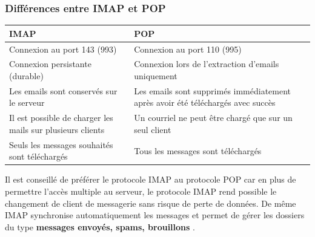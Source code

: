 \documentclass[a4paper,12pt,french]{report} %
\begin{document}
\subsubsection{Différences entre IMAP et POP}
\cesure
\begin{table}[H]
	\centering
\begin{tabu}{|X[l]|X[l]|}
	\hline
	\centering \textbf{IMAP} & \centering \textbf{POP}  \\
	\hline
	Connexion au port 143 (993) & Connexion au port 110 (995) \\
	\hline	
	Connexion persistante (durable) & Connexion lors de l'extraction d'emails uniquement \\
	\hline
	Les emails sont conservés sur le serveur & Les emails sont supprimés immédiatement après avoir été téléchargés avec succès \\
	\hline
	Il est possible de charger les mails sur plusieurs clients & Un courriel ne peut être chargé que sur un seul client \\
	\hline
	Seuls les messages souhaités sont téléchargés & Tous les messages sont téléchargés \\
	\hline	
\end{tabu}
\end{table}
\nocesure

Il est conseillé de préférer le protocole IMAP au protocole POP car en plus de permettre l'accès multiple au serveur, le protocole IMAP rend possible le changement de client de messagerie sans risque de perte de données. De même IMAP synchronise automatiquement les messages et permet de gérer les dossiers du type \textbf{\og messages envoyés, spams, brouillons \fg{}}.
\end{document}
